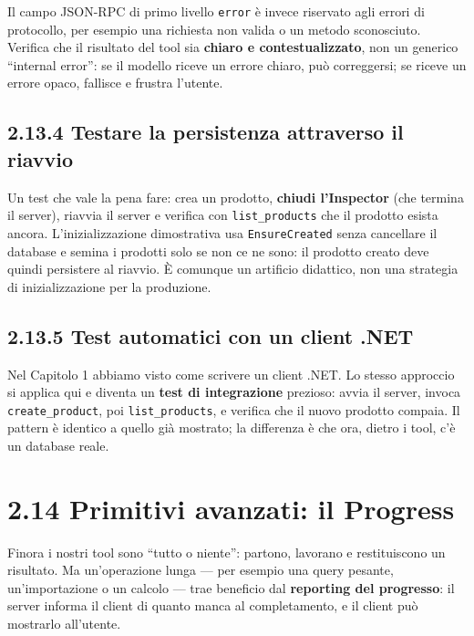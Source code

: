 \documentclass[
  italian,
  10pt,
]{book}
\begin{document}
Il campo JSON-RPC di primo livello \texttt{error} è invece riservato
agli errori di protocollo, per esempio una richiesta non valida o un
metodo sconosciuto. Verifica che il risultato del tool sia
\textbf{chiaro e contestualizzato}, non un generico ``internal error'':
se il modello riceve un errore chiaro, può correggersi; se riceve un
errore opaco, fallisce e frustra l'utente.

\subsection{2.13.4 Testare la persistenza attraverso il
riavvio}\label{testare-la-persistenza-attraverso-il-riavvio}

Un test che vale la pena fare: crea un prodotto, \textbf{chiudi
l'Inspector} (che termina il server), riavvia il server e verifica con
\texttt{list\_products} che il prodotto esista ancora.
L'inizializzazione dimostrativa usa \texttt{EnsureCreated} senza
cancellare il database e semina i prodotti solo se non ce ne sono: il
prodotto creato deve quindi persistere al riavvio. È comunque un
artificio didattico, non una strategia di inizializzazione per la
produzione.

\subsection{2.13.5 Test automatici con un client
.NET}\label{test-automatici-con-un-client-.net}

Nel Capitolo 1 abbiamo visto come scrivere un client .NET. Lo stesso
approccio si applica qui e diventa un \textbf{test di integrazione}
prezioso: avvia il server, invoca \texttt{create\_product}, poi
\texttt{list\_products}, e verifica che il nuovo prodotto compaia. Il
pattern è identico a quello già mostrato; la differenza è che ora,
dietro i tool, c'è un database reale.

\section{2.14 Primitivi avanzati: il
Progress}\label{primitivi-avanzati-il-progress}

Finora i nostri tool sono ``tutto o niente'': partono, lavorano e
restituiscono un risultato. Ma un'operazione lunga --- per esempio una
query pesante, un'importazione o un calcolo --- trae beneficio dal
\textbf{reporting del progresso}: il server informa il client di quanto
manca al completamento, e il client può mostrarlo all'utente.
\end{document}
